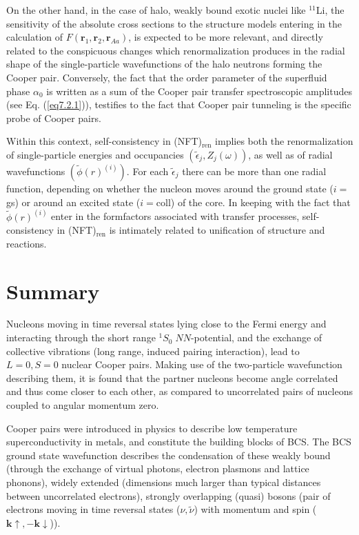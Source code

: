 On the other hand, in the case of halo, weakly bound exotic nuclei like $^{11}$Li, the sensitivity of the absolute cross sections to the structure models entering in the calculation of $F(\mathbf r_1,\mathbf r_2,\mathbf r_{Aa})$, is expected to be more relevant, and directly related to the conspicuous changes which renormalization produces in the radial shape of the single-particle wavefunctions of the halo neutrons forming the Cooper pair. Conversely, the fact that the order parameter of the superfluid phase $\alpha_0$ is written as a sum of the Cooper pair transfer spectroscopic amplitudes (see Eq. (\ref{eq7.2.1})), testifies to the fact that Cooper pair tunneling is the specific probe of Cooper pairs.



Within this context, self-consistency in (NFT)$_{\text{ren}}$ implies both the renormalization of single-particle energies and occupancies $(\tilde\epsilon_j,Z_j(\omega))$, as well as of radial wavefunctions $(\tilde\phi(r)^{(i)})$. For each $\tilde\epsilon_j$ there can be more than one radial function, depending on whether the nucleon moves around the ground state ($i=$gs) or around an excited state ($i=$coll) of the core. In keeping with the fact that $\tilde{\phi}(r)^{(i)}$ enter in  the formfactors associated with transfer processes, self-consistency in (NFT)$_{\text{ren}}$ is intimately related to unification of structure and reactions. 
 \section{Summary}
Nucleons moving in time reversal states lying close to the Fermi energy and interacting through the  short range $^1S_0\;NN$-potential, and the exchange of collective vibrations (long range, induced pairing interaction), lead to $L=0, S=0$ nuclear Cooper pairs. Making use of the two-particle wavefunction describing them, it is found that the partner nucleons become angle correlated and thus come closer to each other, as compared to  uncorrelated pairs of nucleons coupled to angular momentum zero.

Cooper pairs were introduced in physics to describe low temperature superconductivity in metals, and constitute the building blocks of BCS. The BCS ground state wavefunction describes the condensation of these weakly bound (through the exchange of virtual photons, electron plasmons and lattice phonons), widely extended (dimensions much larger than typical distances between uncorrelated electrons), strongly overlapping (quasi) bosons (pair of electrons moving in time reversal states ($\nu,\tilde \nu$) with momentum and spin ($\mathbf k\uparrow,-\mathbf k\downarrow$)).

